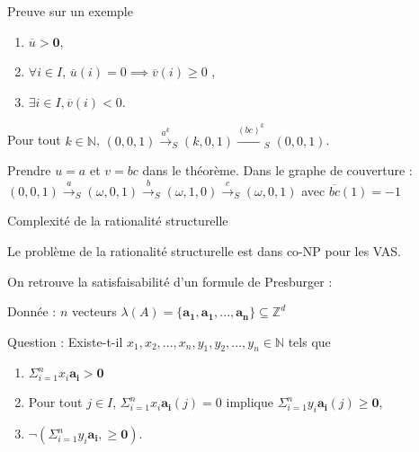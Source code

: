 \documentclass[french]{beamer}
\newcommand{\N}{\ensuremath{\mathbb{N}}}
\newcommand{\Z}{\ensuremath{\mathbb{Z}}}
\newcommand{\trans}[2]{\ensuremath{\stackrel{#1}{\longrightarrow}_{#2}}}
\newcommand{\vect}[1]{\ensuremath{\mathbf{#1}}}
\newcommand{\xinit}{\ensuremath{\vect{x}_\text{init}}}
\newcommand{\valeur}[1]{\ensuremath{\overline{#1}}}
\begin{document}
\begin{frame}{Preuve sur un exemple}
\begin{theorem}[rappel]
\begin{enumerate}
    \item $\valeur{u} > \vect{0}$,
    \item $\forall i \in I$, $\valeur{u}(i)=0 \implies \valeur{v}(i) \geq 0$ ,
    \item $\exists i\in I, \valeur{v}(i) < 0$.
\end{enumerate}
\end{theorem}

\begin{example}
Pour tout $k\in\N$, $(0,0,1) \trans{a^k}{S} (k,0,1) \trans{(bc)^k}{S} (0,0,1)$.

\vspace{2mm}
Prendre $u=a$ et $v=bc$ dans le théorème.
Dans le graphe de couverture :
$(0,0,1) \trans{a}{S} (\omega,0,1) \trans{b}{S} (\omega,1,0) \trans{c}{S} (\omega,0,1)$
avec $\valeur{bc}(1)= -1$
\end{example}

\end{frame}

\begin{frame}{Complexité de la rationalité structurelle}
\begin{theorem}
Le  problème de la rationalité structurelle est dans co-NP pour les VAS.
\end{theorem}

On retrouve la satisfaisabilité d'un formule de Presburger :

\vspace{3mm}
Donnée : $n$ vecteurs $\lambda(A)=\{\vect{a_1}, \vect{a_1}, ..., \vect{a_n}\} \subseteq \Z^d$

Question : Existe-t-il $x_1,x_2,...,x_n, y_1,y_2,...,y_n \in\N$ tels que
\begin{enumerate}
    \item $\Sigma_{i=1}^n x_i \vect{a_i} > \vect{0}$
    \item Pour tout $j \in I$, $\Sigma_{i=1}^n x_i \vect{a_i}(j)=0$ implique $\Sigma_{i=1}^n y_i \vect{a_i}(j) \geq \vect{0}$,
    \item  $\lnot(\Sigma_{i=1}^n y_i \vect{a_i}, \geq \vect{0})$.
\end{enumerate}
\end{frame}
\end{document}
